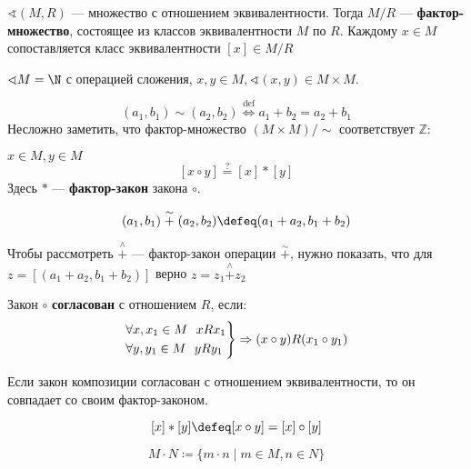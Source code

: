 \begin{definition}
    \(\sphericalangle (M, R)\) --- множество с отношением эквивалентности. Тогда \(M / R\) --- \textbf{фактор-множество}, состоящее из классов эквивалентности \(M\) по \(R\). Каждому \(x \in M\) сопоставляется класс эквивалентности \([x] \in M / R\)
\end{definition}

\begin{example}
    \(\sphericalangle M = \N\) с операцией сложения, \(x, y \in M, \sphericalangle (x, y) \in M \times M\).

    \[(a_1, b_1) \sim (a_2, b_2) \stackrel{\mathrm{def}}{\Leftrightarrow} a_1 + b_2 = a_2 + b_1\]
    Несложно заметить, что фактор-множество \((M \times M) / \sim\) соответствует \(\mathbb{Z}\):
\end{example}

\begin{definition}
    \(x \in M, y \in M\)
    \[[x \circ y] \stackrel{?}{=} [x] * [y]\]
    Здесь \(*\) --- \textbf{фактор-закон} закона \(\circ\).
\end{definition}

\begin{example}
    \[(a_1, b_1) \stackrel{\sim}{+} (a_2, b_2) \defeq (a_1 + a_2, b_1 + b_2)\]

    Чтобы рассмотреть \(\stackrel{\wedge}{+}\) --- фактор-закон операции \(\stackrel{\sim}{+}\), нужно показать, что для \(z = [(a_1 + a_2, b_1 + b_2)]\) верно \(z = z_1 \stackrel{\wedge}{+} z_2\)
\end{example}

\begin{definition}
    Закон \(\circ\) \textbf{согласован} с отношением \(R\), если:
    \[\begin{rcases}
            \forall x, x_1 \in M \ \ xRx_1 \\
            \forall y, y_1 \in M \ \ yRy_1
        \end{rcases} \Rightarrow (x \circ y) R (x_1 \circ y_1)\]
\end{definition}

\begin{theorem}
    Если закон композиции согласован с отношением эквивалентности, то он совпадает со своим фактор-законом.
\end{theorem}

\[[x] * [y] \defeq [x \circ y] = [x] \circ [y]\]

\begin{obozn}
    \[M \cdot N \coloneqq \{m \cdot n \mid m \in M, n \in N\}\]
\end{obozn}

